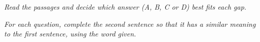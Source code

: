 \documentclass{article}
\begin{document}
\noindent \textit{Read the passages and decide which answer (A, B, C or D) best fits each gap.}

%
%
%
%
%
%
%
%
%
%
%
%
%
%
%
%
%
%
%
%

\noindent \textit{For each question, complete the second sentence so that it has a similar meaning to the first sentence, using the word given.}

%
%
%
%
%
%
%
%
%
%
%
%
%
%
%
%
%
%
%
%
\end{document}
